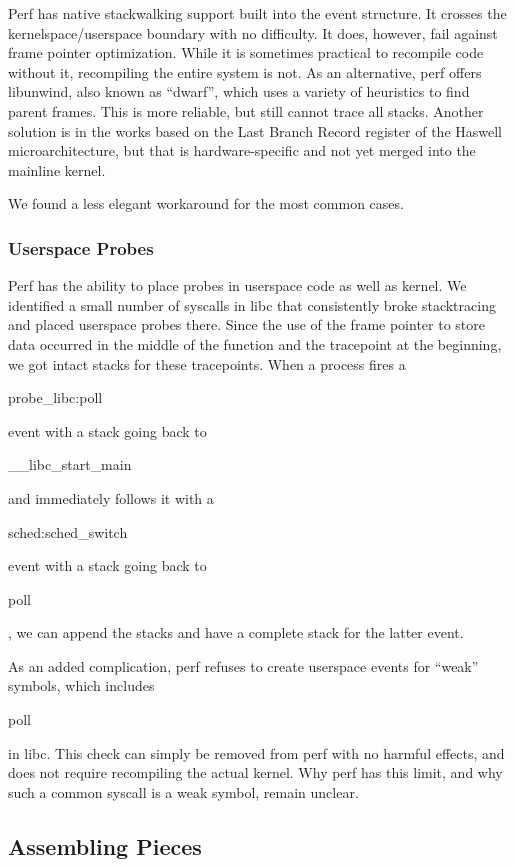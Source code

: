 \documentclass[10pt]{article}
\begin{document}
Perf has native stackwalking support built into the event structure.  It crosses the kernelspace/userspace boundary with no difficulty.  It does, however, fail against frame pointer optimization.  While it is sometimes practical to recompile code without it, recompiling the entire system is not.  As an alternative, perf offers libunwind, also known as ``dwarf'', which uses a variety of heuristics to find parent frames.  This is more reliable, but still cannot trace all stacks.  Another solution is in the works based on the Last Branch Record register of the Haswell microarchitecture, but that is hardware-specific and not yet merged into the mainline kernel.

We found a less elegant workaround for the most common cases.

\subsubsection{Userspace Probes}

Perf has the ability to place probes in userspace code as well as kernel.  We identified a small number of syscalls in libc that consistently broke stacktracing and placed userspace probes there.  Since the use of the frame pointer to store data occurred in the middle of the function and the tracepoint at the beginning, we got intact stacks for these tracepoints.  When a process fires a \begin{tt}probe\_libc:poll\end{tt} event with a stack going back to \begin{tt}\_\_libc\_start\_main\end{tt} and immediately follows it with a \begin{tt}sched:sched\_switch\end{tt} event with a stack going back to \begin{tt}poll\end{tt}, we can append the stacks and have a complete stack for the latter event.

As an added complication, perf refuses to create userspace events for ``weak'' symbols, which includes \begin{tt}poll\end{tt} in libc.  This check can simply be removed from perf with no harmful effects, and does not require recompiling the actual kernel.  Why perf has this limit, and why such a common syscall is a weak symbol, remain unclear.

\subsection{Assembling Pieces}
\end{document}
